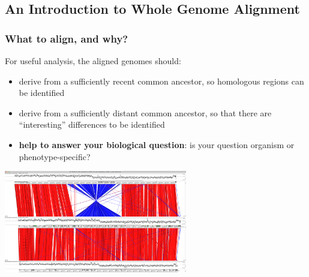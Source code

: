 

\subsection{An Introduction to Whole Genome Alignment}

\begin{frame}
  \frametitle{What to align, and why?}
  For useful analysis, the aligned genomes should:
  \begin{itemize}
    \item derive from a sufficiently recent common ancestor, so homologous regions can be identified
    \item derive from a sufficiently distant common ancestor, so that there are ``interesting'' differences to be identified
    \item \textbf{help to answer your biological question}: is your question organism or phenotype-specific? 
  \end{itemize}
  \begin{center}
    \includegraphics[width=0.6\textwidth]{images/act_comparison}
  \end{center}  
\end{frame}

